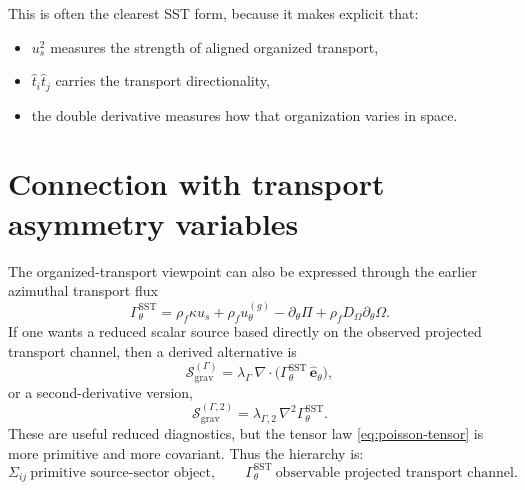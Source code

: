 \documentclass[11pt]{article}
\newcommand{\rhoF}{\rho_{\!f}}
\newcommand{\SST}{\mathrm{SST}}
\newcommand{\grav}{\mathrm{grav}}
\begin{document}
        This is often the clearest SST form, because it makes explicit that:
        \begin{itemize}
            \item \(u_s^2\) measures the strength of aligned organized transport,
            \item \(\hat t_i \hat t_j\) carries the transport directionality,
            \item the double derivative measures how that organization varies in space.
        \end{itemize}
        
        \section{Connection with transport asymmetry variables}
        
        The organized-transport viewpoint can also be expressed through the earlier azimuthal transport flux
        \begin{equation}
            \Gamma_\theta^{\SST}
            =
            \rhoF \kappa u_s
            +
            \rhoF u_\theta^{(g)}
            -
            \partial_\theta \Pi
            +
            \rhoF D_\Omega \partial_\theta \Omega.
            \label{eq:Gamma-theta-repeat}
        \end{equation}
        If one wants a reduced scalar source based directly on the observed projected transport channel, then a derived alternative is
        \begin{equation}
            \mathcal{S}_{\grav}^{(\Gamma)}
            =
            \lambda_\Gamma\, \nabla\cdot\bigl(\Gamma_\theta^{\SST}\,\hat{\mathbf e}_\theta \bigr),
            \label{eq:Sgamma}
        \end{equation}
        or a second-derivative version,
        \begin{equation}
            \mathcal{S}_{\grav}^{(\Gamma,2)}
            =
            \lambda_{\Gamma,2}\,\nabla^2 \Gamma_\theta^{\SST}.
            \label{eq:Sgamma2}
        \end{equation}
        These are useful reduced diagnostics, but the tensor law \eqref{eq:poisson-tensor} is more primitive and more covariant. Thus the hierarchy is:
        \begin{equation}
            \boxed{
                \Sigma_{ij}
                \ \text{primitive source-sector object},
                \qquad
                \Gamma_\theta^{\SST}
                \ \text{observable projected transport channel}.
            }
            \label{eq:hierarchy}
        \end{equation}
        
\end{document}
